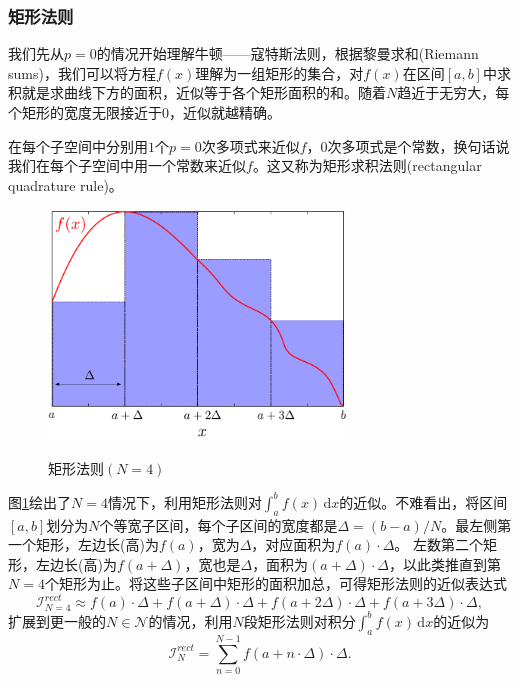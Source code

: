 \subsubsection{矩形法则}
\label{sec:ninc-nc-rectangular-rule}
我们先从$p=0$的情况开始理解牛顿——寇特斯法则，根据黎曼求和(Riemann sums)，我们可以将方程$f(x)$理解为一组矩形的集合，对$f(x)$在区间$[a,b]$中求积就是求曲线下方的面积，近似等于各个矩形面积的和。随着$N$趋近于无穷大，每个矩形的宽度无限接近于$0$，近似就越精确。

在每个子空间中分别用$1$个$p=0$次多项式来近似$f$，$0$次多项式是个常数，换句话说我们在每个子空间中用一个常数来近似$f$。这又称为矩形求积法则(rectangular quadrature rule)。

\begin{figure}[htbp]
   \caption{矩形法则$(N=4)$}
  \centering
  \includegraphics[width=8cm]{./Figures/20180227-rectangular-rule-example.png}
  \label{fig:ninc-nc-rectangular-rule}
%
\end{figure}
图\ref{fig:ninc-nc-rectangular-rule}绘出了$N=4$情况下，利用矩形法则对$\int_{a}^{b} f(x) \, \mathrm{d}x$的近似。不难看出，将区间$[a,b]$划分为$N$个等宽子区间，每个子区间的宽度都是$\Delta = \left(b - a \right)/N$。最左侧第一个矩形，左边长(高)为$f(a)$，宽为$\Delta$，对应面积为$f(a) \cdot \Delta$。
左数第二个矩形，左边长(高)为$f \left( a+\Delta \right)$，宽也是$\Delta$，面积为$\left( a+\Delta \right) \cdot \Delta$，以此类推直到第$N=4$个矩形为止。将这些子区间中矩形的面积加总，可得矩形法则的近似表达式
\begin{equation*}
    \mathcal{I}_{N=4}^{rect}
    \approx
    f(a) \cdot \Delta
    + f \left(a + \Delta \right) \cdot \Delta
    + f \left(a + 2 \Delta \right) \cdot \Delta
    + f \left(a + 3 \Delta \right) \cdot \Delta,
\end{equation*}
扩展到更一般的$N \in \mathcal{N}$的情况，利用$N$段矩形法则对积分$\int_{a}^{b} f(x) \, \mathrm{d} x$的近似为
\begin{equation}
  \label{eq:ninc-nc-rectangular-rule}
  \mathcal{I}_{N}^{rect} = \sum_{n=0}^{N-1} f \left( a + n \cdot \Delta \right) \cdot \Delta.
\end{equation}

